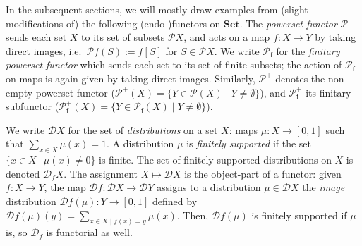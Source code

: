 \documentclass[sigconf,
			final%
			nonacm
                        ]{acmart}
\numberwithin{equation}{section}
\numberwithin{equation}{section}
\theoremstyle{plain}
\theoremstyle{definition}
\newcommand{\Set}{\mathbf{Set}}
\newcommand{\pow}{\mathscr P}              %
\newcommand{\powf}{\pow_{\mathsf f}}
\newcommand{\CalD}{\mathcal{D}}            %
\begin{document}
In the subsequent sections, we will mostly draw examples from (slight
modifications of) the following (endo-)functors on $\Set$. The
\emph{powerset functor} $\pow$ sends each set $X$ to its set of
subsets $\pow X$, and acts on a map $f\colon X\to Y$ by taking direct
images, i.e.~$\pow f(S):= f[S]$ for $S\in\pow X$.
%
We write $\powf$ for the \emph{finitary powerset functor} which sends
each set to its set of finite subsets; the action of $\powf$ on maps is
again given by taking direct images. Similarly, $\pow^+$ denotes the
non-empty powerset functor
($\pow^+(X)=\{Y\in\pow(X)\mid Y\neq\emptyset\}$), and $\powf^+$ its
finitary subfunctor
($\powf^+(X)=\{Y\in\powf(X)\mid Y\neq\emptyset\}$).

We write $\CalD X$ for the set of \emph{distributions} on a set $X$:
maps $\mu\colon X\to [0,1]$ such that $\sum_{x\in X}\mu(x)=1$.  A
distribution $\mu$ is \emph{finitely supported} if the set
$\{x\in X~|~\mu(x)\neq 0\}$ is finite. The set of finitely supported
distributions on $X$ is denoted $\CalD_f X$. The assignment
$X\mapsto\CalD X$ is the object-part of a functor: given
$f\colon X\to Y$, the map $\CalD f\colon\CalD X\to \CalD Y$ assigns to a
distribution $\mu\in\CalD X$ the \emph{image} distribution
$\CalD f(\mu)\colon Y\to [0, 1]$ defined by
$\CalD f(\mu)(y)=\sum_{x\in X\mid f(x)=y} \mu(x)$.  Then,
$\CalD f(\mu)$ is finitely supported if $\mu$ is, so $\CalD_f$ is
functorial as well.
\end{document}
